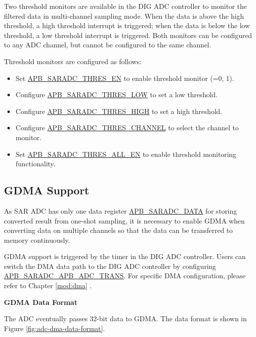 \documentclass[main\_\_EN.tex]{subfiles}
\begin{document}
Two threshold monitors are available in the DIG ADC controller to monitor the filtered data in multi-channel sampling mode. When the data is above the high threshold, a high threshold interrupt is triggered; when the data is below the low threshold, a low threshold interrupt is triggered. Both monitors can be configured to any ADC channel, but cannot be configured to the same channel.

Threshold monitors are configured as follows:

\begin{itemize}
    \item Set \hyperref[fielddesc:APBSARADCTHRESALLEN]{APB\_SARADC\_THRES\_EN} to enable threshold monitor  (=0, 1).
    \item Configure \hyperref[fielddesc:APBSARADCTHRES1LOW]{APB\_SARADC\_THRES\_LOW} to set a low threshold.
    \item Configure \hyperref[fielddesc:APBSARADCTHRES1LOW]{APB\_SARADC\_THRES\_HIGH} to set a high threshold.
    \item Configure \hyperref[fielddesc:APBSARADCTHRES1LOW]{APB\_SARADC\_THRES\_CHANNEL} to select the channel to monitor.
    \item Set \hyperref[fielddesc:APBSARADCTHRESALLEN]{APB\_SARADC\_THRES\_ALL\_EN} to enable threshold monitoring functionality.
\end{itemize}

\subsection{GDMA Support}
\label{sec:adc_gdma_support}

As SAR ADC has only one data register \hyperref[fielddesc:APBSARADCDATA]{APB\_SARADC\_DATA} for storing converted result from one-shot sampling, it is necessary to enable GDMA when converting data on multiple channels so that the data can be transferred to memory continuously.

GDMA support is triggered by the timer in the DIG ADC controller. Users can switch the DMA data path to the DIG ADC controller by configuring \hyperref[fielddesc:APBSARADCAPBADCTRANS]{APB\_SARADC\_APB\_ADC\_TRANS}. For specific DMA configuration, please refer to Chapter \ref{mod:dma} \textit{}.

\textbf{GDMA Data Format}

The ADC eventually passes 32-bit data to GDMA. The data format is shown in Figure \ref{fig:adc-dma-data-format}.
\end{document}
